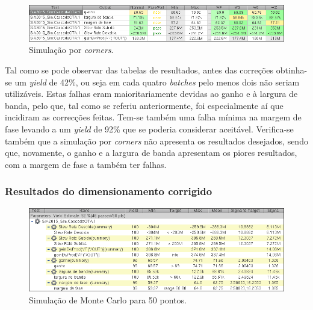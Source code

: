 \documentclass[11pt]{article}
\numberwithin{equation}{section}
\begin{document}
\begin{figure}[H]
	\centering
	\includegraphics[keepaspectratio=true, scale=0.65]{exps/Corners_Antigo}
	\vspace{-0.5em}
	\caption{Simulação por \textit{corners}.}
	\vspace{-0.8em}
\end{figure} 

Tal como se pode observar das tabelas de resultados, antes das correções obtinha-se um \textit{yield} de 42\%, ou seja em cada quatro \textit{batches} pelo menos dois não seriam utilizáveis. Estas falhas eram maioritariamente devidas ao ganho e à largura de banda, pelo que, tal como se referiu anteriormente, foi especialmente aí que incidiram as correcções feitas. Tem-se também uma falha mínima na margem de fase levando a um \textit{yield} de 92\% que se poderia considerar aceitável. Verifica-se também que a simulação por \textit{corners} não apresenta os resultados desejados, sendo que, novamente, o ganho e a largura de banda apresentam os piores resultados, com a margem de fase a também ter falhas.

\subsubsection{Resultados do dimensionamento corrigido} 

\begin{figure}[H]
	\centering
	\includegraphics[keepaspectratio=true, scale=0.65]{exps/MonteCarlo_50pt_Novo}
	\vspace{-0.5em}
	\caption{Simulação de Monte Carlo para 50 pontos.}
	\vspace{-0.8em}
\end{figure} 
\end{document}
